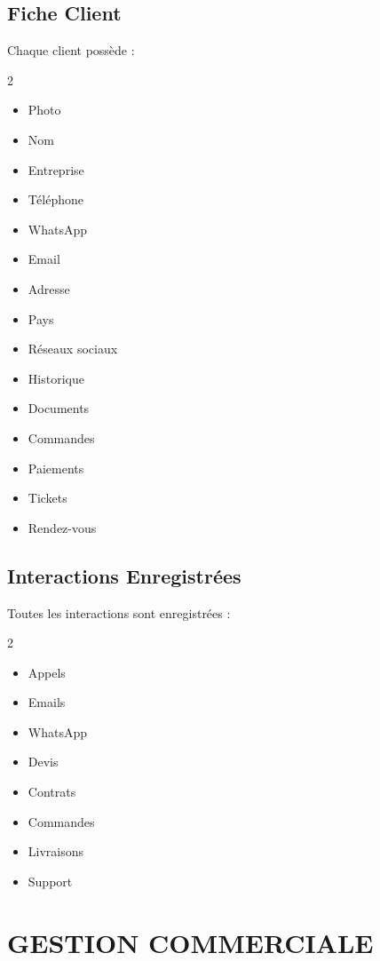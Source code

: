 \documentclass[12pt,a4paper,oneside]{book}
\begin{document}
\section{Fiche Client}
Chaque client possède :
\begin{multicols}{2}
\begin{itemize}
\item Photo
\item Nom
\item Entreprise
\item Téléphone
\item WhatsApp
\item Email
\item Adresse
\item Pays
\item Réseaux sociaux
\item Historique
\item Documents
\item Commandes
\item Paiements
\item Tickets
\item Rendez-vous
\end{itemize}
\end{multicols}

\section{Interactions Enregistrées}
Toutes les interactions sont enregistrées :
\begin{multicols}{2}
\begin{itemize}
\item Appels
\item Emails
\item WhatsApp
\item Devis
\item Contrats
\item Commandes
\item Livraisons
\item Support
\end{itemize}
\end{multicols}

\chapter{GESTION COMMERCIALE}
\end{document}
